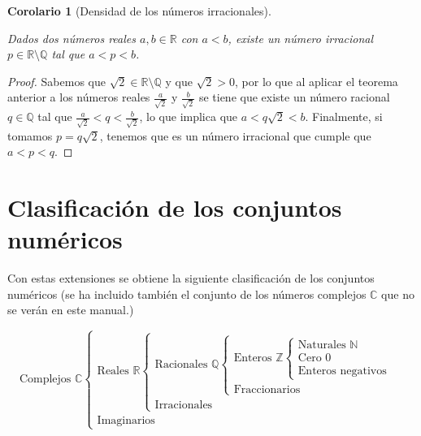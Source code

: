 \documentclass[
  a4paper,
]{scrreport}
\theoremstyle{definition}
\theoremstyle{plain}
\newtheorem{corollary}{Corolario}[chapter]
\theoremstyle{definition}
\theoremstyle{definition}
\theoremstyle{plain}
\theoremstyle{plain}
\theoremstyle{remark}
\begin{document}
\begin{corollary}[Densidad de los números
irracionales]\protect\hypertarget{cor-densidad-irracionales}{}\label{cor-densidad-irracionales}

Dados dos números reales \(a,b\in \mathbb{R}\) con \(a<b\), existe un
número irracional \(p\in \mathbb{R}\setminus \mathbb{Q}\) tal que
\(a<p<b\).

\end{corollary}

\begin{tcolorbox}[enhanced jigsaw, leftrule=.75mm, colbacktitle=quarto-callout-note-color!10!white, toprule=.15mm, opacityback=0, opacitybacktitle=0.6, toptitle=1mm, breakable, bottomtitle=1mm, colframe=quarto-callout-note-color-frame, rightrule=.15mm, titlerule=0mm, title=\textcolor{quarto-callout-note-color}{\faInfo}\hspace{0.5em}{Demostración}, arc=.35mm, left=2mm, bottomrule=.15mm, colback=white, coltitle=black]

\begin{proof}
Sabemos que \(\sqrt{2}\in \mathbb{R}\setminus\mathbb{Q}\) y que
\(\sqrt{2}>0\), por lo que al aplicar el teorema anterior a los números
reales \(\frac{a}{\sqrt{2}}\) y \(\frac{b}{\sqrt{2}}\) se tiene que
existe un número racional \(q\in\mathbb{Q}\) tal que
\(\frac{a}{\sqrt{2}}<q<\frac{b}{\sqrt{2}}\), lo que implica que
\(a<q\sqrt{2}<b\). Finalmente, si tomamos \(p=q\sqrt{2}\), tenemos que
es un número irracional que cumple que \(a<p<q\).
\end{proof}

\end{tcolorbox}

\section{Clasificación de los conjuntos
numéricos}\label{clasificaciuxf3n-de-los-conjuntos-numuxe9ricos}

Con estas extensiones se obtiene la siguiente clasificación de los
conjuntos numéricos (se ha incluido también el conjunto de los números
complejos \(\mathbb{C}\) que no se verán en este manual.)

\[
\mbox{Complejos } \mathbb{C}
    \begin{cases}
    \mbox{Reales } \mathbb{R}
    \begin{cases}
        \mbox{Racionales } \mathbb{Q}
        \begin{cases}
            \mbox{Enteros } \mathbb{Z}
            \begin{cases}
                \mbox{Naturales } \mathbb{N} \\
                \mbox{Cero } 0\\
                \mbox{Enteros negativos}
                \end{cases}\\
            \mbox{Fraccionarios}
        \end{cases}\\
        \mbox{Irracionales}
    \end{cases}\\
    \mbox{Imaginarios}
    \end{cases}
\]
\end{document}
